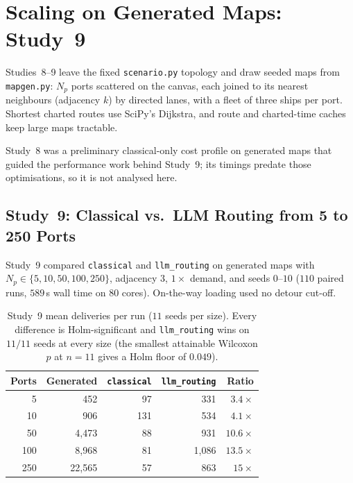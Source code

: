 \documentclass[11pt,a4paper,oneside]{report}
\begin{document}
\section[Scaling on Generated Maps (Study 9)]{Scaling on Generated Maps: Study~9}
\label{sec:future-scalability}
\begin{sloppypar}
Studies~8--9 leave the fixed \texttt{scenario.py} topology and draw seeded maps from \texttt{mapgen.py}: $N_p$ ports scattered on the canvas, each joined to its nearest neighbours (adjacency $k$) by directed lanes, with a fleet of three ships per port. Shortest charted routes use SciPy's Dijkstra, and route and charted-time caches keep large maps tractable.
\end{sloppypar}

Study~8 was a preliminary classical-only cost profile on generated maps that guided the performance work behind Study~9; its timings predate those optimisations, so it is not analysed here.

\subsection{Study~9: Classical vs.\ LLM Routing from 5 to 250 Ports}
Study~9 compared \texttt{classical} and \texttt{llm\_routing} on generated maps with $N_p \in \{5, 10, 50, 100, 250\}$, adjacency $3$, $1\times$ demand, and seeds $0$--$10$ ($110$ paired runs, $589$\,s wall time on $80$ cores). On-the-way loading used no detour cut-off.

\begin{table}[htbp]
\centering
\caption[Study 9 deliveries by map size]{Study~9 mean deliveries per run ($11$ seeds per size). Every difference is Holm-significant and \texttt{llm\_routing} wins on $11/11$ seeds at every size (the smallest attainable Wilcoxon $p$ at $n=11$ gives a Holm floor of $0.049$).}
\label{tab:study9}
\begin{tabular}{rrrrr}
\toprule
Ports & Generated & \texttt{classical} & \texttt{llm\_routing} & Ratio \\
\midrule
5 & 452 & 97 & 331 & $3.4\times$ \\
10 & 906 & 131 & 534 & $4.1\times$ \\
50 & 4{,}473 & 88 & 931 & $10.6\times$ \\
100 & 8{,}968 & 81 & 1{,}086 & $13.5\times$ \\
250 & 22{,}565 & 57 & 863 & $15\times$ \\
\bottomrule
\end{tabular}
\end{table}
\end{document}
